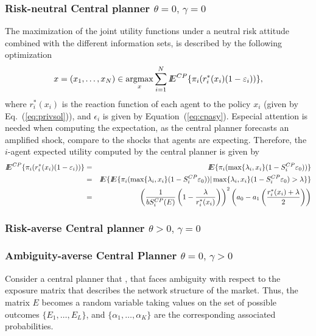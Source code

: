 \subsubsection{Risk-neutral Central planner \(\theta=0,\,\gamma=0\)}
The maximization of the joint utility functions under a neutral risk attitude combined with the different information sets, is described by the following optimization 
\[x=(x_1,\ldots,x_N)\in\mathop{\rm argmax}_{x} \sum_{i=1}^N {I\kern-.35em E}^{CP}\{\pi_i(r_i^*(x_i)(1-\varepsilon_i))\},\]
where \(r_i^*(x_i)\) is the reaction function of each agent to the policy \(x_i\) (given by Eq.~(\ref{eq:privsol})), and \(\epsilon_i\) is given by Equation~(\ref{eq:cpasy}).  Especial attention is needed when computing the expectation, as the central planner forecasts an amplified shock, compare to the shocks that agents are expecting.  Therefore, the \(i\)-agent expected utility computed by the central planner is given by
\begin{eqnarray*}
{I\kern-.35em E}^{CP}\{\pi_i(r_i^*(x_i)(1-\varepsilon_i))\}&=&{I\kern-.35em E}\{\pi_i(\max\{\lambda_i,x_i\}(1-S_i^{CP}\varepsilon_0))\}\\
&=&{I\kern-.35em E}\{{I\kern-.35em E}\{\pi_i(\max\{\lambda_i,x_i\}(1-S_i^{CP}\varepsilon_0))|\max\{\lambda_i,x_i\}(1-S_i^{CP}\varepsilon_0)>\lambda\}\}\\
&=&\left(\frac{1}{bS_i^{CP}(E)}\left(1-\frac{\lambda}{r^*_i(x_i)}\right)\right)^2 \left(a_0-a_1\left(\frac{r_i^*(x_i)+\lambda}{2}\right)\right)
\end{eqnarray*}

  
\subsubsection{Risk-averse Central planner \(\theta>0,\,\gamma=0\)}

\subsubsection{Ambiguity-averse Central Planner \(\theta=0,\,\gamma>0\)}
Consider a central planner that , that faces ambiguity with respect to the exposure matrix that describes the network structure of the market.  Thus, the matrix \(E\) becomes a random variable taking values on the set of possible outcomes \(\{E_1,\ldots,E_L\}\), and \(\{\alpha_1,\ldots,\alpha_K\}\) are the corresponding associated probabilities.


